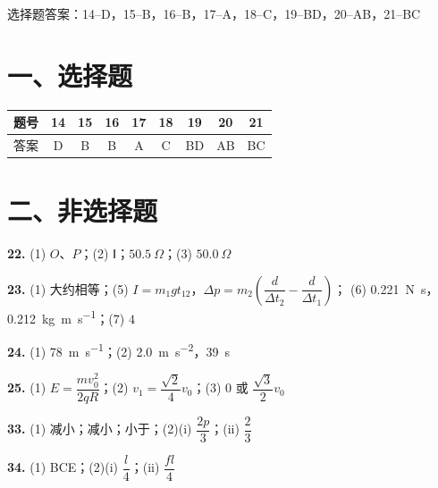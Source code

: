 
\begin{gknotice}
  选择题答案：14--D，15--B，16--B，17--A，18--C，19--BD，20--AB，21--BC
\end{gknotice}

\section*{一、选择题}

\noindent
\begin{tabular}{@{}l*{8}{c}@{}}
\toprule
题号 & 14 & 15 & 16 & 17 & 18 & 19 & 20 & 21\\
\midrule
答案 & D & B & B & A & C & BD & AB & BC\\
\bottomrule
\end{tabular}

\section*{二、非选择题}

\noindent
\textbf{22.} (1) $O$、$P$；\quad (2) Ⅰ；\quad $50.5~\Omega$；\quad (3) $50.0~\Omega$

\medskip
\noindent
\textbf{23.} (1) 大约相等；\quad (5) $I=m_1gt_{12}$，$\Delta p=m_2\left(\dfrac{d}{\Delta t_2}-\dfrac{d}{\Delta t_1}\right)$；\quad
(6) \SI{0.221}{\newton\second}，\SI{0.212}{\kilogram\metre\per\second}；\quad (7) $4$

\medskip
\noindent
\textbf{24.} (1) \SI{78}{\metre\per\second}；\quad (2) \SI{2.0}{\metre\per\second\squared}，\SI{39}{\second}

\medskip
\noindent
\textbf{25.} (1) $E=\dfrac{mv_0^2}{2qR}$；\quad (2) $v_1=\dfrac{\sqrt{2}}{4}v_0$；\quad (3) $0$ 或 $\dfrac{\sqrt{3}}{2}v_0$

\medskip
\noindent
\textbf{33.} (1) 减小；减小；小于；\quad (2)(i) $\dfrac{2p}{3}$；\quad (ii) $\dfrac{2}{3}$

\medskip
\noindent
\textbf{34.} (1) BCE；\quad (2)(i) $\dfrac{l}{4}$；\quad (ii) $\dfrac{fl}{4}$
